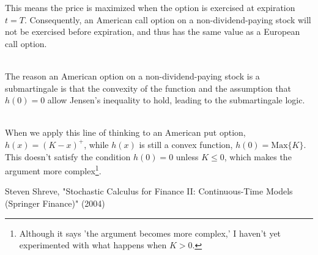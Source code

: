 \documentclass[uplatex,a4j,12pt,dvipdfmx]{jsarticle}
\begin{document}
This means the price is maximized when the option is exercised at expiration $t=T$. Consequently, an American call option on a non-dividend-paying stock will not be exercised before expiration, and thus has the same value as a European call option.


\ \\


The reason an American option on a non-dividend-paying stock is a submartingale is that the convexity of the function and the assumption that $h(0)=0$ allow Jensen's inequality to hold, leading to the submartingale logic.


\ \\

When we apply this line of thinking to an American put option, $h(x)=(K-x)^{+}$, while $h(x)$ is still a convex function, $h(0) = \text{Max}\{K\}$. This doesn't satisfy the condition $h(0)=0$ unless $K \leq 0$, which makes the argument more complex\footnote{Although it says 'the argument becomes more complex,' I haven't yet experimented with what happens when $K > 0$.}.

\begin{thebibliography}{9}
	 Steven Shreve, "Stochastic Calculus for Finance II: Continuous-Time Models (Springer Finance)" (2004)

\end{thebibliography}
\end{document}
